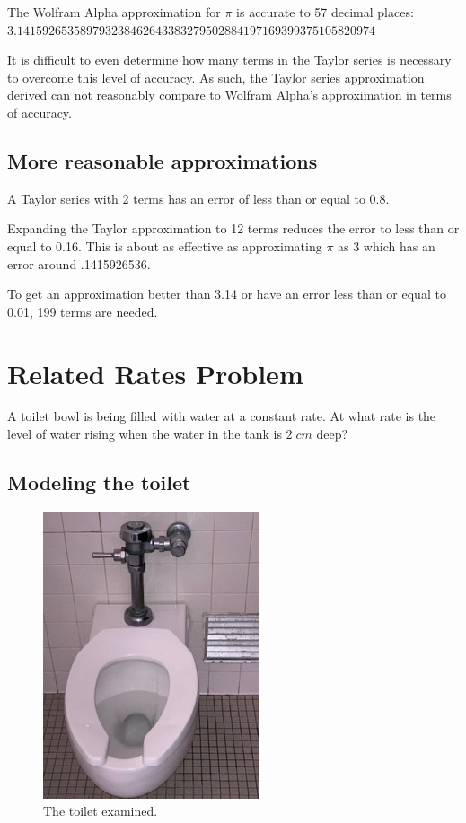 \documentclass[12pt, titlepage]{article}
\begin{document}
The Wolfram Alpha approximation for \(\pi\) is accurate to 57 decimal places: \\
\(3.141592653589793238462643383279502884197169399375105820974\)

It is difficult to even determine how many terms in the Taylor series is necessary to overcome this level of accuracy. As such, the Taylor series approximation derived can not reasonably compare to Wolfram Alpha's approximation in terms of accuracy.

\subsection{More reasonable approximations}
A Taylor series with 2 terms has an error of less than or equal to 0.8.

Expanding the Taylor approximation to 12 terms reduces the error to less than or equal to 0.16. This is about as effective as approximating \(\pi\) as 3 which has an error around .1415926536.

To get an approximation better than 3.14 or have an error less than or equal to 0.01, 199 terms are needed. 

\section{Related Rates Problem}
A toilet bowl is being filled with water at a constant rate. At what rate is the level of water rising when the water in the tank is \(2 \; cm\) deep?

\subsection{Modeling the toilet}
\begin{figure}[H]
\centering
  \includegraphics[angle=270, scale=.75]{toilet.jpeg}
    \caption{The toilet examined.}
\end{figure}
\end{document}
